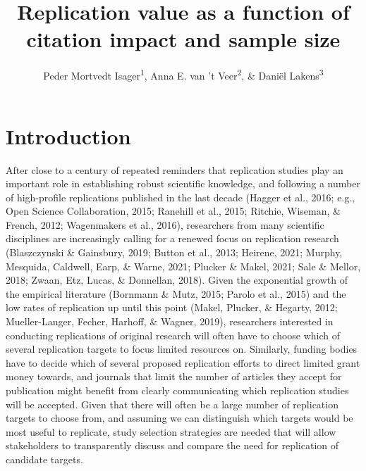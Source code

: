 \documentclass[
  english,
  jou,floatsintext]{apa6}
\title{Replication value as a function of citation impact and sample size}
\author{Peder Mortvedt Isager\textsuperscript{1}, Anna E. van 't Veer\textsuperscript{2}, \& Daniël Lakens\textsuperscript{3}}
\date{}
\affiliation{\vspace{0.5cm}\textsuperscript{1} Department of Psychology, Oslo New University College\\\textsuperscript{2} Methodology and Statistics unit, Institute of Psychology, Leiden University\\\textsuperscript{3} Department of Industrial Engineering \& Innovation Sciences, Eindhoven University of Technology}
\begin{document}
\maketitle

\hypertarget{introduction}{%
\section{Introduction}\label{introduction}}

After close to a century of repeated reminders that replication studies play an important role in establishing robust scientific knowledge, and following a number of high-profile replications published in the last decade (Hagger et al., 2016; e.g., Open Science Collaboration, 2015; Ranehill et al., 2015; Ritchie, Wiseman, \& French, 2012; Wagenmakers et al., 2016), researchers from many scientific disciplines are increasingly calling for a renewed focus on replication research (Blaszczynski \& Gainsbury, 2019; Button et al., 2013; Heirene, 2021; Murphy, Mesquida, Caldwell, Earp, \& Warne, 2021; Plucker \& Makel, 2021; Sale \& Mellor, 2018; Zwaan, Etz, Lucas, \& Donnellan, 2018). Given the exponential growth of the empirical literature (Bornmann \& Mutz, 2015; Parolo et al., 2015) and the low rates of replication up until this point (Makel, Plucker, \& Hegarty, 2012; Mueller-Langer, Fecher, Harhoff, \& Wagner, 2019), researchers interested in conducting replications of original research will often have to choose which of several replication targets to focus limited resources on. Similarly, funding bodies have to decide which of several proposed replication efforts to direct limited grant money towards, and journals that limit the number of articles they accept for publication might benefit from clearly communicating which replication studies will be accepted. Given that there will often be a large number of replication targets to choose from, and assuming we can distinguish which targets would be most useful to replicate, study selection strategies are needed that will allow stakeholders to transparently discuss and compare the need for replication of candidate targets.
\end{document}
